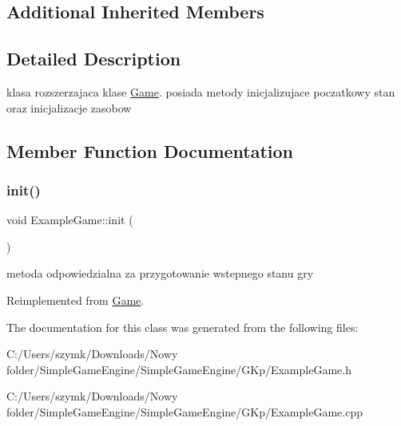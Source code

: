 \subsection*{Additional Inherited Members}


\subsection{Detailed Description}
klasa rozszerzajaca klase \hyperlink{class_game}{Game}. posiada metody inicjalizujace poczatkowy stan oraz inicjalizacje zasobow 



\subsection{Member Function Documentation}
\mbox{\label{class_example_game_ab7b84dad80cbf4eefd562f0c8e6495ab}} 
\subsubsection{\texorpdfstring{init()}{init()}}
{\footnotesize\ttfamily void Example\+Game\+::init (\begin{DoxyParamCaption}{ }\end{DoxyParamCaption})\hspace{0.3cm}{\ttfamily [virtual]}}



metoda odpowiedzialna za przygotowanie wstepnego stanu gry 



Reimplemented from \hyperlink{class_game_a6f3a33940524b6ba9d83f627ccb14bbf}{Game}.



The documentation for this class was generated from the following files\+:\begin{DoxyCompactItemize}
\item 
C\+:/\+Users/szymk/\+Downloads/\+Nowy folder/\+Simple\+Game\+Engine/\+Simple\+Game\+Engine/\+G\+Kp/Example\+Game.\+h\item 
C\+:/\+Users/szymk/\+Downloads/\+Nowy folder/\+Simple\+Game\+Engine/\+Simple\+Game\+Engine/\+G\+Kp/Example\+Game.\+cpp\end{DoxyCompactItemize}
